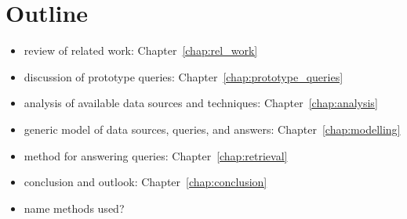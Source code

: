 \section{Outline}
\label{sec:outline}

\begin{itemize}
  \item
    review of related work: Chapter~\ref{chap:rel_work}
  \item
    discussion of prototype queries: Chapter~\ref{chap:prototype_queries}
  \item
    analysis of available data sources and techniques: Chapter~\ref{chap:analysis}
  \item
    generic model of data sources, queries, and answers: Chapter~\ref{chap:modelling}
  \item
    method for answering queries: Chapter~\ref{chap:retrieval}
  \item
    conclusion and outlook: Chapter~\ref{chap:conclusion}
  \item
    name methods used?
\end{itemize}


